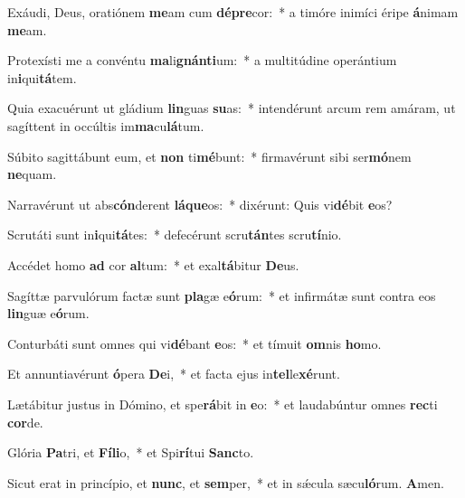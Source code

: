 \item Exáudi, Deus, oratiónem \textbf{me}am cum \textbf{dé}\textbf{pre}cor:~* a timóre inimíci éripe \textbf{á}nimam \textbf{me}am.
\item Protexísti me a convéntu \textbf{ma}li\textbf{gnán}\textbf{ti}um:~* a multitúdine operántium in\textbf{i}qui\textbf{tá}tem.
\item Quia exacuérunt ut gládium \textbf{lin}guas \textbf{su}as:~* intendérunt arcum rem amáram, ut sagíttent in occúltis im\textbf{ma}cu\textbf{lá}tum.
\item Súbito sagittábunt eum, et \textbf{non} ti\textbf{mé}bunt:~* firmavérunt sibi ser\textbf{mó}nem \textbf{ne}quam.
\item Narravérunt ut abs\textbf{cón}derent \textbf{lá}\textbf{que}os:~* dixérunt: Quis vi\textbf{dé}bit \textbf{e}os?
\item Scrutáti sunt in\textbf{i}qui\textbf{tá}tes:~* defecérunt scru\textbf{tán}tes scru\textbf{tí}nio.
\item Accédet homo \textbf{ad} cor \textbf{al}tum:~* et exal\textbf{tá}bitur \textbf{De}us.
\item Sagíttæ parvulórum factæ sunt \textbf{pla}gæ e\textbf{ó}rum:~* et infirmátæ sunt contra eos \textbf{lin}guæ e\textbf{ó}rum.
\item Conturbáti sunt omnes qui vi\textbf{dé}bant \textbf{e}os:~* et tímuit \textbf{om}nis \textbf{ho}mo.
\item Et annuntiavérunt \textbf{ó}pera \textbf{De}i,~* et facta ejus in\textbf{tel}le\textbf{xé}runt.
\item Lætábitur justus in Dómino, et spe\textbf{rá}bit in \textbf{e}o:~* et laudabúntur omnes \textbf{rec}ti \textbf{cor}de.
\item Glória \textbf{Pa}tri, et \textbf{Fí}\textbf{li}o,~* et Spi\textbf{rí}tui \textbf{Sanc}to.
\item Sicut erat in princípio, et \textbf{nunc}, et \textbf{sem}per,~* et in sǽcula sæcu\textbf{ló}rum. \textbf{A}men.
